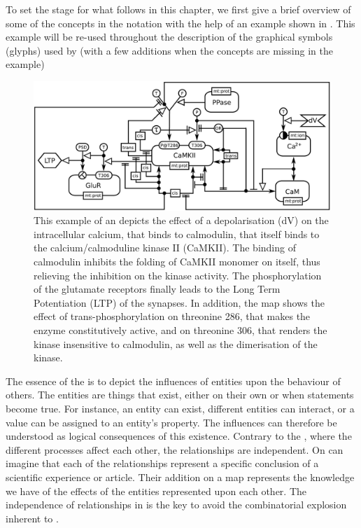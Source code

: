 
To set the stage for what follows in this chapter, we first give a brief overview of some of the concepts in the \ER notation with the help of an example shown in . This example will be re-used throughout the description of the graphical symbols (glyphs) used by \SBGNERLone (with a few additions when the concepts are missing in the example) 

\begin{figure}[H]
  \centering
  \vspace*{-0.75em}
  \includegraphics[scale=0.45]{examples/CaMKII-intro-new-2}
   \caption{This example of an \ERm depicts the effect of a depolarisation (dV) on the intracellular calcium, that binds to calmodulin, that itself binds to the calcium/calmoduline kinase II (CaMKII). The binding of calmodulin inhibits the folding of CaMKII monomer on itself, thus relieving the inhibition on the kinase activity. The phosphorylation of the glutamate receptors finally leads to the Long Term Potentiation (LTP) of the synapses. In addition, the map shows the effect of trans-phosphorylation on threonine 286, that makes the enzyme constitutively active, and on threonine 306, that renders the kinase insensitive to calmodulin, as well as the dimerisation of the kinase.}
  \label{fig:eg1}
\end{figure}
 
The essence of the \ERs is to depict the influences of entities upon the behaviour of others. The entities are things that exist, either on their own or when statements become true. For instance, an entity can exist, different entities can interact, or a value can be assigned to an entity's property. The influences can therefore be understood as logical consequences of this existence. Contrary to the \PDl, where the different processes affect each other, the relationships are independent. On can imagine that each of the relationships represent a specific conclusion of a scientific experience or article. Their addition on a map represents the knowledge we have of the effects of the entities represented upon each other. The independence of relationships in \ERs is the key to avoid the combinatorial explosion inherent to \PDs.

